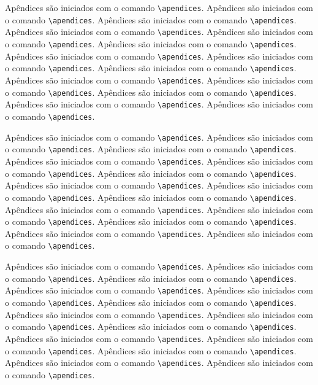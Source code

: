 Apêndices são iniciados com o comando \verb|\apendices|.
Apêndices são iniciados com o comando \verb|\apendices|.
Apêndices são iniciados com o comando \verb|\apendices|.
Apêndices são iniciados com o comando \verb|\apendices|.
Apêndices são iniciados com o comando \verb|\apendices|.
Apêndices são iniciados com o comando \verb|\apendices|.
Apêndices são iniciados com o comando \verb|\apendices|.
Apêndices são iniciados com o comando \verb|\apendices|.
Apêndices são iniciados com o comando \verb|\apendices|.
Apêndices são iniciados com o comando \verb|\apendices|.
Apêndices são iniciados com o comando \verb|\apendices|.
Apêndices são iniciados com o comando \verb|\apendices|.
Apêndices são iniciados com o comando \verb|\apendices|.
Apêndices são iniciados com o comando \verb|\apendices|.

Apêndices são iniciados com o comando \verb|\apendices|.
Apêndices são iniciados com o comando \verb|\apendices|.
Apêndices são iniciados com o comando \verb|\apendices|.
Apêndices são iniciados com o comando \verb|\apendices|.
Apêndices são iniciados com o comando \verb|\apendices|.
Apêndices são iniciados com o comando \verb|\apendices|.
Apêndices são iniciados com o comando \verb|\apendices|.
Apêndices são iniciados com o comando \verb|\apendices|.
Apêndices são iniciados com o comando \verb|\apendices|.
Apêndices são iniciados com o comando \verb|\apendices|.
Apêndices são iniciados com o comando \verb|\apendices|.
Apêndices são iniciados com o comando \verb|\apendices|.
Apêndices são iniciados com o comando \verb|\apendices|.
Apêndices são iniciados com o comando \verb|\apendices|.

Apêndices são iniciados com o comando \verb|\apendices|.
Apêndices são iniciados com o comando \verb|\apendices|.
Apêndices são iniciados com o comando \verb|\apendices|.
Apêndices são iniciados com o comando \verb|\apendices|.
Apêndices são iniciados com o comando \verb|\apendices|.
Apêndices são iniciados com o comando \verb|\apendices|.
Apêndices são iniciados com o comando \verb|\apendices|.
Apêndices são iniciados com o comando \verb|\apendices|.
Apêndices são iniciados com o comando \verb|\apendices|.
Apêndices são iniciados com o comando \verb|\apendices|.
Apêndices são iniciados com o comando \verb|\apendices|.
Apêndices são iniciados com o comando \verb|\apendices|.
Apêndices são iniciados com o comando \verb|\apendices|.
Apêndices são iniciados com o comando \verb|\apendices|.